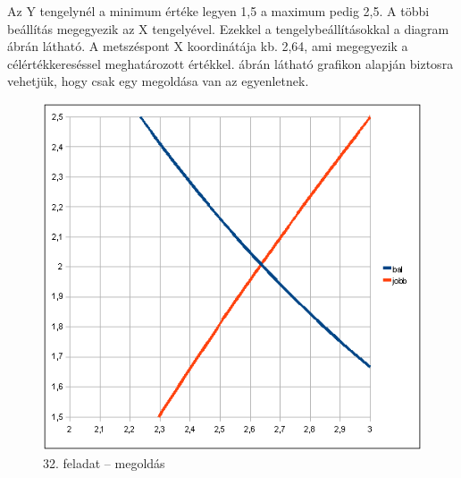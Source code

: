 Az Y tengelynél a minimum értéke legyen 1,5 a maximum pedig 2,5. A
többi beállítás megegyezik az X tengelyével. Ezekkel a
tengelybeállításokkal a diagram  ábrán látható.
A metszéspont X koordinátája kb. 2,64, ami megegyezik a
célértékkereséssel meghatározott értékkel. 
ábrán látható grafikon alapján biztosra vehetjük, hogy csak
egy megoldása van az egyenletnek.

\begin{figure}[!h]
\begin{center}
\includegraphics[width=12.203cm]{oocalcv1-img144.png}
\caption{32. feladat -- megoldás}\label{32-feladatMegoldás}
\end{center}
\end{figure}

